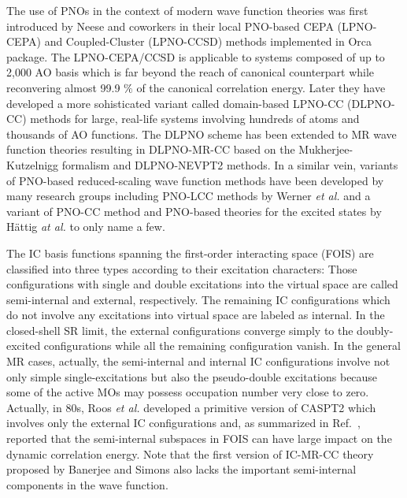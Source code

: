 \documentclass[aip,jcp,amsmath]{revtex4-1}
\begin{document}
%
The use of PNOs in the context of modern wave function theories was first introduced by Neese and coworkers in their local PNO-based CEPA (LPNO-CEPA)\cite{neeseefficient2009cepa} and Coupled-Cluster (LPNO-CCSD)\cite{neeseefficient2009,hansenefficient2011,doi:10.1021/ct100445s} methods implemented in Orca package.\cite{WCMS:WCMS1327}
%
The LPNO-CEPA/CCSD is applicable to systems composed of up to 2,000 AO basis which is far beyond the reach of canonical counterpart while reconvering almost 99.9 $\%$ of the canonical correlation energy.
%
Later they have developed a more sohisticated variant called domain-based LPNO-CC (DLPNO-CC) methods for large, real-life systems involving hundreds of atoms and thousands of AO functions.\cite{riplingeran2013,riplingernatural2013,pinskisparse2015,riplingersparse2016,doi:10.1063/1.4981521,dipayan2016}
%
The DLPNO scheme has been extended to MR wave function theories resulting in DLPNO-MR-CC based on the Mukherjee-Kutzelnigg formalism\cite{doi:10.1021/acs.jctc.5b00334,doi:10.1021/acs.jctc.7b01184,C8CP03577F} and DLPNO-NEVPT2\cite{:/content/aip/journal/jcp/144/9/10.1063/1.4942769} methods.
%
In a similar vein, variants of PNO-based reduced-scaling wave function methods have been developed by many research groups including PNO-LCC methods by Werner {\it et al.}\cite{doi:10.1021/ct500725e,wernersdecay,doi:10.1021/acs.jctc.7b00554,publ7820099,publ8744633,publ9370681,publ9337428} and a variant of PNO-CC method and PNO-based theories for the excited states by H\"attig {\it at al.}\cite{doi:10.1080/00268976.2013.794314,doi:10.1080/00268976.2016.1263762,doi:10.1063/1.4972001,QUA:QUA24098,C4CP03502J,:/content/aip/journal/jcp/135/7/10.1063/1.3624370,:/content/aip/journal/jcp/135/21/10.1063/1.3664902,:/content/aip/journal/jcp/136/20/10.1063/1.4719981,:/content/aip/journal/jcp/139/8/10.1063/1.4819071} to only name a few.

%
The IC basis functions spanning the first-order interacting space (FOIS) are classified into three types according to their excitation characters:
%
Those configurations with single and double excitations into the virtual space are called semi-internal and external, respectively.
%
The remaining IC configurations which do not involve any excitations into virtual space are labeled as internal.
%
In the closed-shell SR limit, the external configurations converge simply to the doubly-excited configurations while all the remaining configuration vanish.
%
In the general MR cases, actually, the semi-internal and internal IC configurations involve not only simple single-excitations but also the pseudo-double excitations because some of the active MOs may possess occupation number very close to zero.
%
Actually, in 80s, Roos {\it et al.} developed a primitive version of CASPT2 which involves only the external IC configurations\cite{ROOS1982197} and, as summarized in Ref.~, reported that the semi-internal subspaces in FOIS can have large impact on the dynamic correlation energy.
%
Note that the first version of IC-MR-CC theory proposed by Banerjee and Simons also lacks the important semi-internal components in the wave function.\cite{simons1981}
\end{document}
